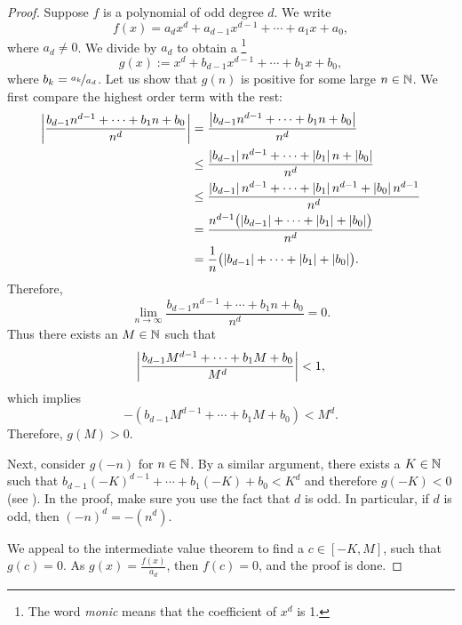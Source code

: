 \begin{proof}
Suppose $f$ is a polynomial of odd degree $d$.  We write
\begin{equation*}
f(x) = a_d x^d + a_{d-1} x^{d-1} + \cdots + a_1 x + a_0 ,
\end{equation*}
where $a_d \not= 0$.  We divide by $a_d$ to obtain a 
\emph{}\footnote{The word \emph{monic} means that
the coefficient of $x^d$ is 1.}
\begin{equation*}
g(x) := x^d + b_{d-1} x^{d-1} + \cdots + b_1 x + b_0 ,
\end{equation*}
where $b_k = \nicefrac{a_k}{a_d}$.
Let us show that $g(n)$ is
positive for some large $n \in {\mathbb{N}}$.
We first compare the highest order term with the rest:
\begin{equation*}
\begin{split}
\left\lvert {\frac{b_{d-1} n^{d-1} + \cdots + b_1 n + b_0}{n^d}} \right\rvert
& =
\frac{\left\lvert {b_{d-1} n^{d-1} + \cdots + b_1 n + b_0} \right\rvert}{n^d}
\\
& \leq
\frac{\left\lvert {b_{d-1}} \right\rvert n^{d-1} + \cdots + \left\lvert {b_1} \right\rvert n + \left\lvert {b_0} \right\rvert}{n^d}
\\
& \leq
\frac{\left\lvert {b_{d-1}} \right\rvert n^{d-1} + \cdots + \left\lvert {b_1} \right\rvert n^{d-1} + \left\lvert {b_0} \right\rvert n^{d-1}}{n^d}
\\
& =
\frac{n^{d-1}\bigl(\left\lvert {b_{d-1}} \right\rvert + \cdots + \left\lvert {b_1} \right\rvert + \left\lvert {b_0} \right\rvert\bigr)}{n^d}
\\
& =
\frac{1}{n}
\bigl(\left\lvert {b_{d-1}} \right\rvert + \cdots + \left\lvert {b_1} \right\rvert + \left\lvert {b_0} \right\rvert\bigr) .
\end{split}
\end{equation*}
Therefore,
\begin{equation*}
\lim_{n\to\infty} \frac{b_{d-1} n^{d-1} + \cdots + b_1 n + b_0}{n^d}
= 0 .
\end{equation*}
Thus there exists an $M \in {\mathbb{N}}$ such that 
\begin{equation*}
\left\lvert {\frac{b_{d-1} M^{d-1} + \cdots + b_1 M + b_0}{M^d}} \right\rvert < 1 ,
\end{equation*}
which implies
\begin{equation*}
-(b_{d-1} M^{d-1} + \cdots + b_1 M + b_0) < M^d .
\end{equation*}
Therefore, $g(M) > 0$.

Next, consider $g(-n)$ for $n \in {\mathbb{N}}$.  By a similar argument,
there exists a $K \in {\mathbb{N}}$ such that
$b_{d-1} {(-K)}^{d-1} + \cdots + b_1 (-K) + b_0 < K^d$
and therefore $g(-K) < 0$ (see ).
In the proof,
 make sure you use the fact that $d$ is odd.
In particular, if $d$ is odd, then ${(-n)}^d = -(n^d)$.

We appeal to the intermediate value theorem to find a
$c \in [-K,M]$, such that $g(c) = 0$.  As $g(x) = \frac{f(x)}{a_d}$,
then $f(c) = 0$, and the proof is done.
\end{proof}

